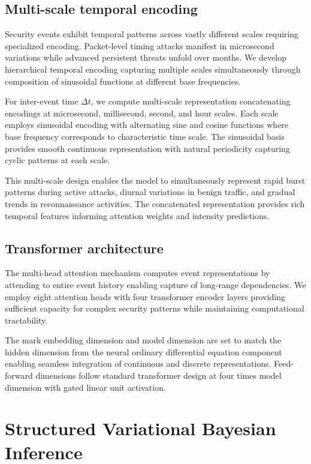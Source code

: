\documentclass[10pt,journal,compsoc]{IEEEtran}
\begin{document}
\subsection{Multi-scale temporal encoding}

Security events exhibit temporal patterns across vastly different scales requiring specialized encoding. Packet-level timing attacks manifest in microsecond variations while advanced persistent threats unfold over months. We develop hierarchical temporal encoding capturing multiple scales simultaneously through composition of sinusoidal functions at different base frequencies.

For inter-event time $\Delta t$, we compute multi-scale representation concatenating encodings at microsecond, millisecond, second, and hour scales. Each scale employs sinusoidal encoding with alternating sine and cosine functions where base frequency corresponds to characteristic time scale. The sinusoidal basis provides smooth continuous representation with natural periodicity capturing cyclic patterns at each scale.

This multi-scale design enables the model to simultaneously represent rapid burst patterns during active attacks, diurnal variations in benign traffic, and gradual trends in reconnaissance activities. The concatenated representation provides rich temporal features informing attention weights and intensity predictions.

\subsection{Transformer architecture}

The multi-head attention mechanism computes event representations by attending to entire event history enabling capture of long-range dependencies. We employ eight attention heads with four transformer encoder layers providing sufficient capacity for complex security patterns while maintaining computational tractability.

The mark embedding dimension and model dimension are set to match the hidden dimension from the neural ordinary differential equation component enabling seamless integration of continuous and discrete representations. Feed-forward dimensions follow standard transformer design at four times model dimension with gated linear unit activation.

\section{Structured Variational Bayesian Inference}
\label{sec:bayesian}
\end{document}
